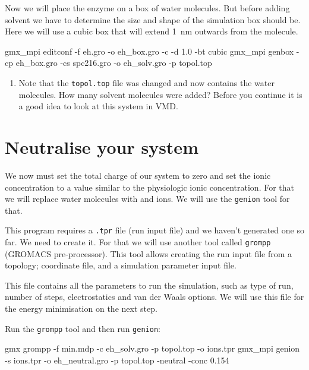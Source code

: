 \documentclass[10pt]{article}
\begin{document}
Now we will place the enzyme on a box of water molecules. But before adding solvent we have to determine the size and shape of the simulation box should be. Here we will use a cubic box that will extend 1~nm outwards from the molecule.

\begin{cmdline}
gmx_mpi editconf -f eh.gro -o eh_box.gro -c -d 1.0 -bt cubic
gmx_mpi genbox -cp eh_box.gro -cs spc216.gro -o eh_solv.gro -p topol.top
\end{cmdline}

\vspace{-0.3cm}

\begin{question} 
    \begin{enumerate}[leftmargin=0.6cm]
        \renewcommand{\labelenumi}{Q\arabic{enumi}.}
        \setcounter{enumi}{6}
        \item Note that the \texttt{topol.top} file was changed and now contains the water molecules. How many solvent molecules were added? Before you continue it is a good idea to look at this system in VMD. 
    \end{enumerate}
\end{question}


\section{Neutralise your system}

We now must set the total charge of our system to zero and set the ionic concentration to a value similar to the physiologic ionic concentration. For that we will replace water molecules with  and  ions. We will use the \texttt{genion} tool for that. 

This program requires a \texttt{.tpr} file (run input file) and we haven't generated one so far. We need to create it. For that we will use another tool called \texttt{grompp} (GROMACS pre-processor). This tool allows creating the run input file from a topology; coordinate file, and a simulation parameter input file. 

This file contains all the parameters to run the simulation, such as type of run, number of steps, electrostatics and van der Waals options. We will use this file for the energy minimisation on the next step. 

Run the \texttt{grompp} tool and then run \texttt{genion}:
\begin{cmdline}
gmx grompp -f min.mdp -c eh_solv.gro -p topol.top -o ions.tpr
gmx_mpi genion -s ions.tpr -o eh_neutral.gro -p topol.top -neutral -conc 0.154 
\end{cmdline}
\end{document}
